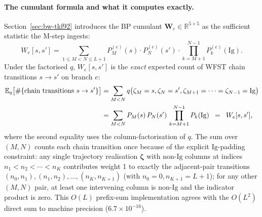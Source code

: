 \paragraph{The cumulant formula and what it computes exactly.}
Section~\ref{sec:bw-tkf92} introduces the BP cumulant $\mathbf{W}_e
\in \mathbb{R}^{5 \times 5}$ as the sufficient statistic the
M-step ingests:
\begin{equation}
\label{eq:cumulant-W}
W_e[s, s']
= \sum_{1 \leq M < N \leq L+1}
   P_M^{(e)}(s) \cdot P_N^{(e)}(s') \cdot
   \prod_{k = M+1}^{N-1} P_k^{(e)}(\mathrm{Ig}).
\end{equation}
Under the factorised $q$, $W_e[s, s']$ is the \emph{exact}
expected count of WFST chain transitions $s \to s'$ on branch $e$:
\begin{align*}
\mathbb{E}_q\bigl[\#\{\text{chain transitions } s \to s'\}\bigr]
&= \sum_{M < N} q\bigl(\zeta_M = s, \zeta_N = s',
                        \zeta_{M+1} = \cdots = \zeta_{N-1} = \mathrm{Ig}\bigr) \\
&= \sum_{M < N} P_M(s)\,P_N(s')\,\prod_{k=M+1}^{N-1} P_k(\mathrm{Ig})
\;\;=\;\; W_e[s, s'],
\end{align*}
where the second equality uses the column-factorisation of $q$.
The sum over $(M, N)$ counts each chain transition once because
of the explicit $\mathrm{Ig}$-padding constraint: any single trajectory
realisation $\boldsymbol{\zeta}$ with non-$\mathrm{Ig}$ columns at indices
$n_1 < n_2 < \cdots < n_K$ contributes weight 1 to exactly the
adjacent-pair transitions $(n_0, n_1), (n_1, n_2), \dots,
(n_K, n_{K+1})$ (with $n_0 = 0, n_{K+1} = L+1$); for any other
$(M, N)$ pair, at least one intervening column is non-$\mathrm{Ig}$ and
the indicator product is zero.  This $O(L)$ prefix-sum implementation
agrees with the $O(L^2)$ direct sum to machine precision
($6.7\times 10^{-16}$).


